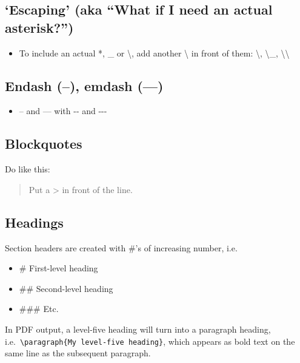 \documentclass[a4paper, nobind]{templates/ociamthesis}
\providecommand{\tightlist}{%
  \setlength{\itemsep}{0pt}\setlength{\parskip}{0pt}}
\begin{document}
\hypertarget{escaping-aka-what-if-i-need-an-actual-asterisk}{%
\subsection{`Escaping' (aka ``What if I need an actual asterisk?'')}\label{escaping-aka-what-if-i-need-an-actual-asterisk}}

\begin{itemize}
\tightlist
\item
  To include an actual *, \_ or \textbackslash, add another \textbackslash{} in front of them: \textbackslash*, \textbackslash\_, \textbackslash\textbackslash{}
\end{itemize}

\hypertarget{endash-emdash}{%
\subsection{Endash (--), emdash (---)}\label{endash-emdash}}

\begin{itemize}
\tightlist
\item
  -- and --- with -\/- and -\/-\/-
\end{itemize}

\hypertarget{blockquotes}{%
\subsection{Blockquotes}\label{blockquotes}}

Do like this:

\begin{quote}
Put a \textgreater{} in front of the line.
\end{quote}

\hypertarget{headings}{%
\subsection{Headings}\label{headings}}

Section headers are created with \#'s of increasing number, i.e.~

\begin{itemize}
\tightlist
\item
  \# First-level heading
\item
  \#\# Second-level heading
\item
  \#\#\# Etc.
\end{itemize}

In PDF output, a level-five heading will turn into a paragraph heading, i.e.~\texttt{\textbackslash{}paragraph\{My\ level-five\ heading\}}, which appears as bold text on the same line as the subsequent paragraph.
\end{document}
